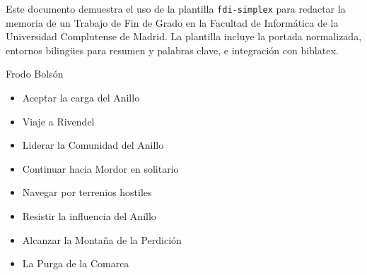 \documentclass[tfg,estilo=digital,portada=normativa]{fdi-simplex}
\begin{document}
\makeportada

\frontmatter

\begin{resumen}
Este documento demuestra el uso de la plantilla \texttt{fdi-simplex}
para redactar la memoria de un Trabajo de Fin de Grado en la
Facultad de Informática de la Universidad Complutense de Madrid. La
plantilla incluye la portada normalizada, entornos bilingües para
resumen y palabras clave, e integración con biblatex.
\end{resumen}

\begin{abstract}
This document demonstrates the \texttt{fdi-simplex} template for
writing the report of a Bachelor's Thesis at the Faculty of
Computer Science of the Complutense University of Madrid. The
template provides a normalized cover page, bilingual abstract and
keyword environments, and biblatex integration.
\end{abstract}

\tableofcontents

\mainmatter






\backmatter

\begin{contribucion}{Frodo Bolsón}
\begin{itemize}
\item Aceptar la carga del Anillo
\item Viaje a Rivendel
\item Liderar la Comunidad del Anillo
\item Continuar hacia Mordor en solitario
\item Navegar por terrenios hostiles
\item Resistir la influencia del Anillo
\item Alcanzar la Montaña de la Perdición
\item La Purga de la Comarca
\end{itemize}
\end{contribucion}
\end{document}
